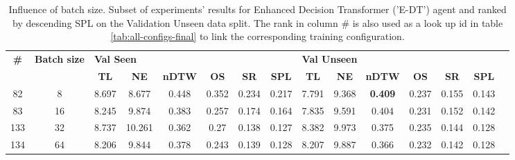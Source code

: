 \begin{table}
\centering
\caption{\label{tab:e_dt_batch_test}Influence of batch size. Subset of experiments' results for Enhanced Decision Transformer ('E-DT') agent and ranked by descending SPL on the Validation Unseen data split. The rank in column \# is also used as a look up id in table \ref{tab:all-configs-final} to link the corresponding training configuration.}
\begin{tabular}{@{\hskip3pt}c@{\hskip3pt}c@{\hskip3pt}c@{\hskip3pt}c@{\hskip3pt}c@{\hskip3pt}c@{\hskip3pt}c@{\hskip3pt}c@{\hskip3pt}c@{\hskip3pt}c@{\hskip3pt}c@{\hskip3pt}c@{\hskip3pt}c@{\hskip3pt}c@{\hskip3pt}c}
\toprule
\textbf{\#} & \textbf{Batch size} & \multicolumn{6}{l}{\textbf{Val Seen}} & \multicolumn{6}{l}{\textbf{Val Unseen}} \\
 \textbf{~} &          \textbf{~} &       \textbf{TL} & \textbf{NE} & \textbf{nDTW} & \textbf{OS} & \textbf{SR} & \textbf{SPL} &         \textbf{TL} & \textbf{NE} &   \textbf{nDTW} & \textbf{OS} & \textbf{SR} & \textbf{SPL} \\
\midrule
         82 &                   8 &             8.697 &       8.677 &         0.448 &       0.352 &       0.234 &        0.217 &               7.791 &       9.368 &  \textbf{0.409} &       0.237 &       0.155 &        0.143 \\
         83 &                  16 &             8.245 &       9.874 &         0.383 &       0.257 &       0.174 &        0.164 &               7.835 &       9.591 &           0.404 &       0.231 &       0.152 &        0.142 \\
        133 &                  32 &             8.737 &      10.261 &         0.362 &        0.27 &       0.138 &        0.127 &               8.382 &       9.973 &           0.375 &       0.235 &       0.144 &        0.128 \\
        134 &                  64 &             8.206 &       9.844 &         0.378 &       0.243 &       0.139 &        0.128 &               8.207 &       9.887 &           0.366 &       0.232 &       0.142 &        0.128 \\
\bottomrule
\end{tabular}
\end{table}
